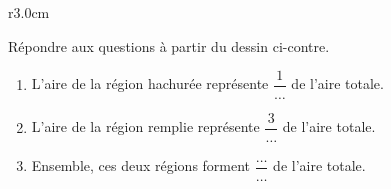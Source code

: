 
\begin{exercice}\label{exosmath-0874}


\begin{wrapfigure}[2]{r}{3.0cm}
   \vspace{-1cm}        %
   \centering
   
\end{wrapfigure}

Répondre aux questions à partir du dessin ci-contre.
\begin{enumerate}
    \item
                L'aire de la région hachurée représente \( \dfrac{ 1 }{ \ldots }\) de l'aire totale.
            \item
                L'aire de la région remplie représente \( \dfrac{ 3 }{ \ldots }\) de l'aire totale.
    \item
        Ensemble, ces deux régions forment \( \dfrac{ \ldots }{ \ldots }\) de l'aire totale.
\end{enumerate}

\end{exercice}

